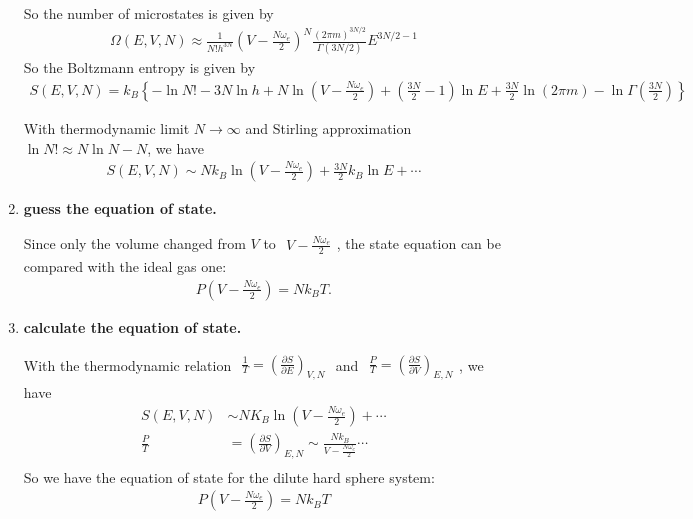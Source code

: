 \documentclass[../../main.tex]{subfiles}
\begin{document}
\begin{enumerate}
\begin{align*}
    \end{align*}
    So the number of microstates is given by
    \begin{align*}
      \Omega(E,V,N) \approx \frac{1}{N!h^{3N}}\left(V - \frac{N\omega_{e}}{2}\right)^{N}\frac{(2\pi m)^{3N/2}}{\Gamma(3N/2)}E^{3N/2 - 1}
    \end{align*}
    So the Boltzmann entropy is given by
    \begin{align*}
      S(E,V,N) = k_{B}\left\{
        -\ln{N!} - 3N\ln{h} + N\ln{\left(V - \frac{N\omega_{e}}{2}\right)}  + \left(\frac{3N}{2} - 1\right)\ln{E} + \frac{3N}{2}\ln{(2\pi m)} - \ln{\Gamma\left(\frac{3N}{2}\right)}
      \right\}
    \end{align*}

    With thermodynamic limit $N\rightarrow \infty$ and Stirling approximation $\ln{N!}\approx N\ln{N} - N$, we have
    \begin{align*}
      S(E,V,N) \sim Nk_{B}\ln{\left(V - \frac{N\omega_{e}}{2}\right)} + \frac{3N}{2}k_{B}\ln{E} + \cdots
    \end{align*}

    \item \textbf{guess the equation of state.}  
    
    Since only the volume changed from $V$ to $\begin{aligned}
      V - \frac{N\omega_{e}}{2}
    \end{aligned}$, the state equation can be compared with the ideal gas one:
    \begin{align*}
      P\left(V - \frac{N\omega_{e}}{2}\right) = Nk_{B}T.
    \end{align*}
    \item \textbf{calculate the equation of state.}
    
    With the thermodynamic relation $\begin{aligned}
      \frac{1}{T} = \left(\frac{\partial S}{\partial E}\right)_{V,N}
    \end{aligned}$ and $\begin{aligned}
      \frac{P}{T} = \left(\frac{\partial S}{\partial V}\right)_{E,N}
    \end{aligned}$, we have
    \begin{align*}
      S(E,V,N) &\sim NK_{B}\ln{\left(V - \frac{N\omega_{e}}{2}\right)} +\cdots\\
      \frac{P}{T} &= \left(\frac{\partial S}{\partial V}\right)_{E,N} \sim \frac{Nk_{B}}{V - \frac{N\omega_{e}}{2}}\cdots\\
    \end{align*}
    So we have the equation of state for the dilute hard sphere system:
    \begin{align*}
      \boxed{P\left(V - \frac{N\omega_{e}}{2}\right) = Nk_{B}T}
    \end{align*}
  \end{enumerate}
\end{document}

